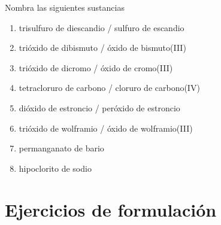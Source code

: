 \documentclass[10pt,a5paper,twoside]{article}
\begin{document}
\begin{exercise}[
    tags    = {inorgánica,nomenclatura,múltiple,2B},
    topics  = {química inorgánica,formulación,nomenclatura},
    source  = {Química 2B SAN 2016, p372, e11},
  ]
  Nombra las siguientes sustancias

  \begin{enumerate}\begin{multicols}{2}
    \item {}
    \item {}
    \item {}
    \item {}
    \item {}
    \item {}
    \item {}
    \item {}
  \end{multicols}\end{enumerate}
\end{exercise}

\begin{solution}
  \begin{enumerate}
    \item trisulfuro de diescandio / sulfuro de escandio
    \item trióxido de dibismuto / óxido de bismuto(III)
    \item trióxido de dicromo / óxido de cromo(III)
    \item tetracloruro de carbono / cloruro de carbono(IV)
    \item dióxido de estroncio / peróxido de estroncio
    \item trióxido de wolframio / óxido de wolframio(III)
    \item permanganato de bario
    \item hipoclorito de sodio
  \end{enumerate}
\end{solution}

















\section{Ejercicios de formulación}
\end{document}
